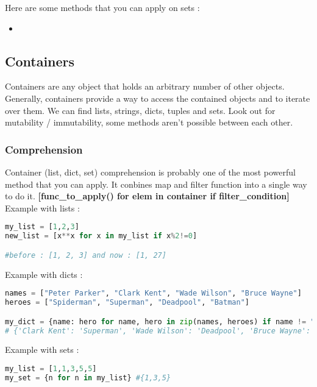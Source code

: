 \documentclass[a4paper, 12pt, titlepage]{scrartcl} %
\begin{document}
Here are some methods that you can apply on sets : 
\begin{itemize}
\item
\end{itemize}

\subsection{Containers}
Containers are any object that holds an arbitrary number of other objects. Generally, containers provide a way to access the contained objects and to iterate over them. We can find lists, strings, dicts, tuples and sets. Look out for mutability / immutability, some methods aren't possible between each other. \\

\subsubsection{Comprehension}
\label{Comprehension}
Container (list, dict, set) comprehension is probably one of the most powerful method that you can apply. It conbines map and filter function into a single way to do it. \textbf{[func\_to\_apply() for elem in container if filter\_condition]} \\

Example with lists :
\begin{lstlisting}[language=Python]
my_list = [1,2,3]
new_list = [x**x for x in my_list if x%2!=0]

#before : [1, 2, 3] and now : [1, 27]
\end{lstlisting}

Example with dicts :
\begin{lstlisting}[language=Python]
names = ["Peter Parker", "Clark Kent", "Wade Wilson", "Bruce Wayne"]
heroes = ["Spiderman", "Superman", "Deadpool", "Batman"]

my_dict = {name: hero for name, hero in zip(names, heroes) if name != "Peter Parker"}
# {'Clark Kent': 'Superman', 'Wade Wilson': 'Deadpool', 'Bruce Wayne': 'Batman'}
\end{lstlisting}

Example with sets :
\begin{lstlisting}[language=Python]
my_list = [1,1,3,5,5]
my_set = {n for n in my_list} #{1,3,5}
\end{lstlisting}
\end{document}
